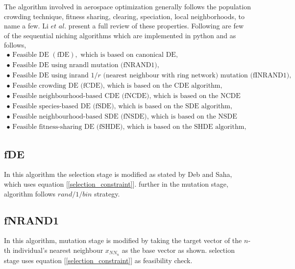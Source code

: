 The algorithm involved in aerospace optimization generally follows the population crowding technique\cite{De_jong,thomsen}, fitness sharing\cite{michigan,thomsen,goldberg}, clearing\cite{petrowski}, speciation\cite{balazs,Li}, local neighborhoods\cite{vrahatis,vrahatis_1}, to name a few. Li $et$ $al$. present a full review of these properties\cite{li_1}. Following are few of the sequential niching algorithms which are implemented in python and as follows\cite{Poole3}, 
$$
\begin{array}{l}
{\bullet \text { Feasible DE }(\mathrm{fDE}), \text { which is based on canonical DE, }} \\ 
{\bullet \text { Feasible DE using nrandl mutation (fNRAND1), }}\\
{\bullet \text { Feasible DE using inrand } 1 / r \text { (nearest neighbour with ring network) mutation (fINRAND1), }} \\
{\bullet \text { Feasible crowding DE (fCDE), which is based on the CDE algorithm, }} \\
{\bullet \text { Feasible neighbourhood-based CDE (fNCDE), which is based on the NCDE algorithm,  }} \\ {\bullet \text { Feasible species-based DE (fSDE), which is based on the SDE algorithm, }} \\
{\bullet \text { Feasible neighbourhood-based SDE (fNSDE), which is based on the NSDE algorithm, }} \\ {\bullet \text { Feasible fitness-sharing DE (fSHDE), which is based on the SHDE algorithm, }}
\end{array}
$$


\subsection{fDE}
In this algorithm the selection stage is modified as stated by Deb and Saha\cite{Deb}, which uses equation [\ref{selection_constraint}]. further in the mutation stage, algorithm follows $rand/1/bin$ strategy.


\subsection{fNRAND1}
In this algorithm, mutation stage is modified by taking the target vector of the \(n\)-th individual's nearest neighbour $x_{{NN}_n}$ as the base vector as shown. selection stage uses equation [\ref{selection_constraint}] as feasibility check.




